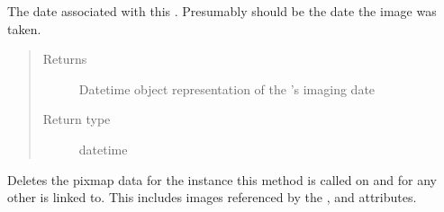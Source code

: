 \documentclass[letterpaper,10pt,english]{sphinxmanual}
\begin{document}
\begin{fulllineitems}
\begin{fulllineitems}
\end{fulllineitems}


\begin{fulllineitems}
\label{\detokenize{polo.crystallography:polo.crystallography.image.Image.date}}
The date associated with this 
{\hyperref[\detokenize{polo.crystallography:polo.crystallography.image.Image}]{}}.
Presumably should be the date the image was taken.
\begin{quote}\begin{description}
\item[{Returns}] \leavevmode
Datetime object representation of
the {\hyperref[\detokenize{polo.crystallography:polo.crystallography.image.Image}]{}}’s
imaging date

\item[{Return type}] \leavevmode
datetime

\end{description}\end{quote}

\end{fulllineitems}


\begin{fulllineitems}
\label{\detokenize{polo.crystallography:polo.crystallography.image.Image.delete_all_pixmap_data}}
Deletes the pixmap data for the
{\hyperref[\detokenize{polo.crystallography:polo.crystallography.image.Image}]{}} instance this method is
called on and for any other 
 is linked to.
This includes images referenced by the 
,  and
attributes.

\end{fulllineitems}



\end{fulllineitems}
\end{document}
